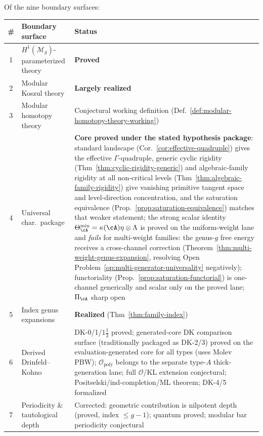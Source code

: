 \begin{remark}\label{rem:nine-futures-summary}
Of the nine boundary surfaces:
\begin{center}
\renewcommand{\arraystretch}{1.2}
\begin{tabular}{@{}clp{5.5cm}@{}}
\toprule
\textbf{\#} & \textbf{Boundary surface} & \textbf{Status} \\
\midrule
1 & $H^1(\mathcal{M}_g)$-parameterized theory & \textbf{Proved} \\
2 & Modular Koszul theory & \textbf{Largely realized} \\
3 & Modular homotopy theory & Conjectural working definition (Def.~\ref{def:modular-homotopy-theory-working}) \\
4 & Universal char.\ package & \textbf{Core proved under the stated hypothesis package}: standard landscape (Cor.~\ref{cor:effective-quadruple}) gives the effective \(\Gamma\)-quadruple, generic cyclic rigidity (Thm~\ref{thm:cyclic-rigidity-generic}) and algebraic-family rigidity at all non-critical levels (Thm~\ref{thm:algebraic-family-rigidity}) give vanishing primitive tangent space and level-direction concentration, and the saturation equivalence (Prop.~\ref{prop:saturation-equivalence}) matches that weaker statement; the strong scalar identity $\Theta_{\cA}^{\min}=\kappa(\cA)\eta\otimes\Lambda$ is proved on the uniform-weight lane and \emph{fails} for multi-weight families: the genus-$g$ free energy receives a cross-channel correction (Theorem~\ref{thm:multi-weight-genus-expansion}, resolving Open Problem~\ref{op:multi-generator-universality} negatively); functoriality (Prop.~\ref{prop:saturation-functorial}) is one-channel generically and scalar only on the proved lane; $\Pi_{\cA}$ sharp open \\
5 & Index genus expansions & \textbf{Realized} (Thm~\ref{thm:family-index}) \\
6 & Derived Drinfeld--Kohno & DK-0/1/$1\frac{1}{2}$ proved; generated-core DK comparison surface \textup{(}traditionally packaged as DK-2/3\textup{)} proved on the evaluation-generated core for all types \textup{(}uses Molev PBW\textup{)}; $\mathcal{O}_{\mathrm{poly}}$ belongs to the separate type-$A$ thick-generation lane; full $\mathcal{O}$/KL extension conjectural; Positselski/ind-completion/ML theorem; DK-4/5 formalized \\
7 & Periodicity \& tautological depth & Corrected: geometric contribution is nilpotent depth (proved, index $\leq g-1$); quantum proved; modular bar periodicity conjectural \\

\end{tabular}
\end{center}
\end{remark}
